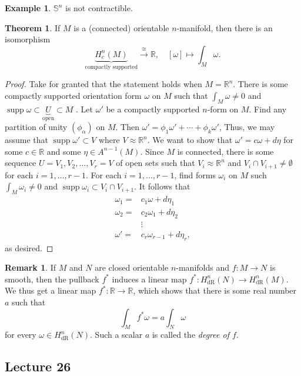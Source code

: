 \documentclass[10pt,letterpaper,cm]{nupset}
\theoremstyle{definition}
\newtheorem{exmp}{Example}
\newtheorem{remark}{Remark}
\newtheorem{theorem}{Theorem}
\newcommand{\R}{\mathbb R}
\renewcommand{\S}{\mathbb S}
\newcommand{\1}{\mathbf{1}}
\newcommand{\0}{\vec 0}
\DeclareMathOperator{\supp}{supp}
\DeclareMathOperator{\dr}{dR}
\begin{document}
\begin{exmp}
$\S^n$ is not contractible.
\end{exmp}

\begin{theorem}
If $M$ is a (connected) orientable $n$-manifold, then there is an isomorphism $$\underbrace{H_c^n(M)}_{\text{compactly supported}} \overset{\cong}{\longrightarrow} \R, \quad [\omega] \mapsto \int_M \omega.$$
\end{theorem}
\begin{proof}
Take for granted that the statement holds when $M = \R^n$. There is some compactly supported orientation form $\omega$ on $M$ such that $\int_M \omega \ne 0$ and $\supp \omega \subset \underbrace{U}_{\text{open}}\subset M$ . Let $\omega'$ be a compactly supported $n$-form on $M$. Find any partition of unity $(\phi_{\alpha})$ on $M$. Then $\omega' =\phi_1\omega' +\cdots + \phi_k \omega'$, Thus, we may assume  that $\supp \omega' \subset V$ where $V \approx \R^n$. We want to show that $\omega' =c\omega + d\eta$ for some $c\in \R$ and some $\eta \in A^{n-1}(M)$. Since $M$ is connected, there is some sequence $U=V_1, V_2, \ldots, V_r=V$ of open sets such that $V_i\approx \R^n$ and $V_i\cap V_{i+1} \ne \emptyset$ for each $i=1, \ldots, r-1$. For each $i=1, \ldots, r-1$, find forms $\omega_i$ on $M$ such $\int_M \omega_i \ne 0$ and $\supp \omega_i \subset V_i \cap V_{i+1}$.  It follows that 
\begin{align*}
 \omega_1  =& c_1\omega + d\eta_1
\\ \omega_2  =& c_2\omega_1+ d\eta_2
\\ & \vdots
\\  \omega'  =&  c_r\omega_{r-1}+d\eta_r
, \end{align*} as desired.
\end{proof}

\begin{remark}
If $M$ and $N$ are closed orientable $n$-manifolds and $f: M \to N$ is smooth, then the pullback $f^{\ast}$ induces a linear map $f^{\ast}: H_{\dr}^n(N) \to H_{\dr}^n(M)$. We thus get a linear map $f^{\ast} : \R \to \R$, which shows that there is some  real number $a$ such that $$\int_{M} f^{\ast} \omega = a\int_N \omega$$ for every $\omega \in H_{\dr}^n(N) $. Such a scalar $a$ is called the \textit{degree of $f$}. 
\end{remark}

\subsection{Lecture 26}
\end{document}
